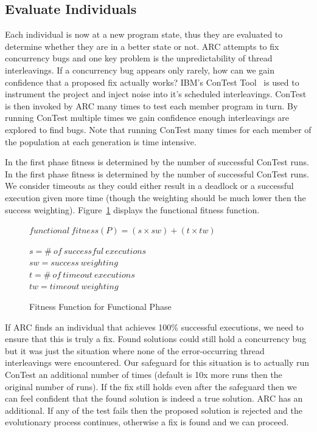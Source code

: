 \documentclass[10pt, conference, compsocconf]{IEEEtran}
\begin{document}
\subsection{Evaluate Individuals}
\label{sec:evalute_individuals}

Each individual is now at a new program state, thus they are evaluated to
determine whether they are in a better state or not. ARC attempts to fix
concurrency bugs and one key problem is the unpredictability of thread
interleavings.  If a concurrency bug appears only rarely, how can we gain
confidence that a proposed fix actually works?  IBM's ConTest
Tool~\cite{EFN+02} is used to instrument the project and inject noise into it's
scheduled interleavings. ConTest is then invoked by ARC many times to test each
member program in turn. By running ConTest multiple times we gain confidence
enough interleavings are explored to find bugs. Note that running ConTest many
times for each member of the population at each generation is time intensive.

In the first phase fitness is determined by the number of successful ConTest
runs. In the first phase fitness is determined by the number of successful
ConTest runs. We consider timeouts as they could either result in a deadlock or
a successful execution given more time (though the weighting should be much
lower then the success weighting). Figure~\ref{fig:functional_fitness} displays
the functional fitness function.

\begin{figure}
\begin{footnotesize}
\begin{center}
$functional\ fitness(P) = (s \times sw) + (t \times tw)$
\end{center}
\end{footnotesize}
\begin{tiny}
\begin{center}
$s = \#\ of\ successful\ executions$ \\
$sw = success\ weighting$ \\
$t = \#\ of\ timeout\ executions$ \\
$tw = timeout\ weighting$
\end{center}
\end{tiny}
\caption{Fitness Function for Functional Phase}
\label{fig:functional_fitness}
\end{figure}

If ARC finds an individual that achieves 100\% successful executions, we need
to ensure that this is truly a fix. Found solutions could still hold a
concurrency bug but it was just the situation where none of the error-occurring
thread interleavings were encountered. Our safeguard for this situation is to
actually run ConTest an additional number of times (default is 10x more runs
then the original number of runs). If the fix still holds even after the
safeguard then we can feel confident that the found solution is indeed a true
solution. ARC has an additional. If any of the test fails then the proposed
solution is rejected and the evolutionary process continues, otherwise a fix is
found and we can proceed.
\end{document}
